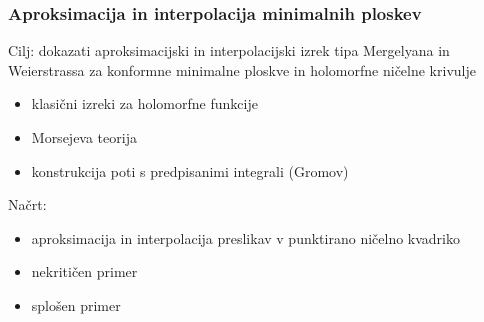 \documentclass[9pt, table]{beamer}
\begin{document}

\begin{frame}
\frametitle{Aproksimacija in interpolacija minimalnih ploskev}

Cilj: dokazati aproksimacijski in interpolacijski izrek tipa Mergelyana in Weierstrassa za konformne minimalne ploskve in holomorfne ničelne krivulje

\begin{itemize}
\item klasični izreki za holomorfne funkcije
\item Morsejeva teorija
\item konstrukcija poti s predpisanimi integrali (Gromov)
\end{itemize}
\vspace{0.4cm}
\pause

Načrt: 
\begin{itemize}
\item aproksimacija in interpolacija preslikav v punktirano ničelno kvadriko
\item nekritičen primer
\item splošen primer
\end{itemize}

\end{frame}

\end{document}
